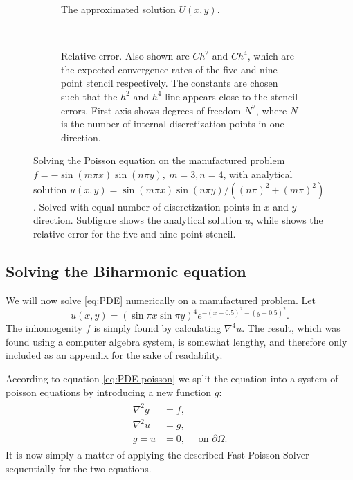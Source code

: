 \begin{figure}[tb]
  \centering
  \begin{subfigure}[t]{0.48\textwidth}
    \caption{The approximated solution $U(x, y)$.}
    \label{fig:pde:order_solution}
  \end{subfigure}
  ~
  \begin{subfigure}[t]{0.48\textwidth}

    \centering 
    \caption{Relative error.
      Also shown are $Ch^2$ and $Ch^4$, which are the expected convergence rates of the five and nine point stencil respectively.
      The constants are chosen such that the $h^2$ and $h^4$ line appears close to the stencil errors.
      First axis shows degrees of freedom $N^2$, where $N$ is the number of internal discretization points in one direction.
    }
    \label{fig:pde:order}
  \end{subfigure}
  \caption{Solving the Poisson equation on the manufactured problem $f=-\sin(m \pi x)\sin(n\pi y), ~m = 3, n=4$, with analytical solution $u(x, y) = \sin(m \pi x)\sin(n \pi y) / ((n\pi)^2 + (m\pi)^2)$.
    Solved with equal number of discretization points in $x$ and $y$ direction.
    Subfigure  shows the analytical solution $u$, while  shows the relative error for the five and nine point stencil.
  }
\end{figure}


\subsection{Solving the Biharmonic equation}
\label{sec:pde:solving}
We will now solve \eqref{eq:PDE} numerically on a manufactured problem.
Let
$$
u(x, y) =
\left(
\sin \pi x
\sin \pi y
\right)^4
e^{-(x-0.5)^2 - (y-0.5)^2}.
$$
The inhomogenity $f$ is simply found by calculating $\nabla^4 u$.
The result, which was found using a computer algebra system, is somewhat lengthy, and therefore only included as an appendix for the sake of readability.



According to equation \eqref{eq:PDE-poisson} we split the equation into a system of poisson equations by introducing a new function $g$:
\begin{align}\label{eq:biharmonic_poisson}
  \begin{split}
    \nabla^2g &= f,\\
    \nabla^2u &= g,\\
    g = u &= 0,\quad \text{ on } \partial \Omega.
  \end{split}
\end{align}
It is now simply a matter of applying the described Fast Poisson Solver sequentially for the two equations.


